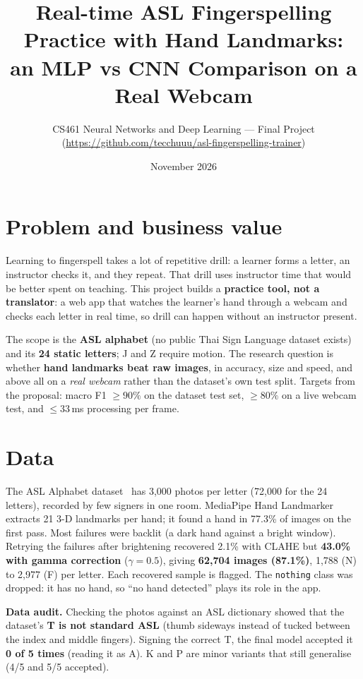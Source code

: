 \documentclass[10pt,a4paper]{article}
\title{Real-time ASL Fingerspelling Practice with Hand Landmarks:\\
       an MLP vs CNN Comparison on a Real Webcam}
\author{CS461 Neural Networks and Deep Learning --- Final Project\\
        \small \studentline \quad (\url{https://github.com/tecchuuu/asl-fingerspelling-trainer})}
\date{November 2026}
\begin{document}
\maketitle

\section{Problem and business value}

Learning to fingerspell takes a lot of repetitive drill: a learner forms a letter, an
instructor checks it, and they repeat. That drill uses instructor time that would be better
spent on teaching. This project builds a \textbf{practice tool, not a translator}: a web app
that watches the learner's hand through a webcam and checks each letter in real time, so drill
can happen without an instructor present.

The scope is the \textbf{ASL alphabet} (no public Thai Sign Language dataset exists) and its
\textbf{24 static letters}; J and Z require motion. The research question is whether
\textbf{hand landmarks beat raw images}, in accuracy, size and speed, and above all on a
\emph{real webcam} rather than the dataset's own test split. Targets from the proposal: macro
F1 $\geq 90\%$ on the dataset test set, $\geq 80\%$ on a live webcam test, and $\leq 33$\,ms
processing per frame.

\section{Data}

The ASL Alphabet dataset~\cite{asl} has 3,000 photos per letter (72,000 for the 24 letters),
recorded by few signers in one room. MediaPipe Hand Landmarker~\cite{mediapipe} extracts 21
3-D landmarks per hand; it found a hand in 77.3\% of images on the first pass. Most failures
were backlit (a dark hand against a bright window). Retrying the failures after brightening
recovered 2.1\% with CLAHE but \textbf{43.0\% with gamma correction} ($\gamma=0.5$), giving
\textbf{62,704 images (87.1\%)}, 1,788 (N) to 2,977 (F) per letter. Each recovered sample is
flagged. The \texttt{nothing} class was dropped: it has no hand, so ``no hand detected'' plays
its role in the app.

\textbf{Data audit.} Checking the photos against an ASL dictionary showed that the dataset's
\textbf{T is not standard ASL} (thumb sideways instead of tucked between the index and middle
fingers). Signing the correct T, the final model accepted it \textbf{0 of 5 times} (reading it
as A). K and P are minor variants that still generalise (4/5 and 5/5 accepted).
\end{document}
